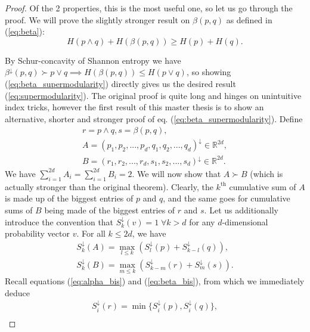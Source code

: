\begin{proof} \label{proof:alternative_supermodularity}
    Of the 2 properties, this is the most useful one, so let us go through the proof. We will prove the slightly stronger result on $\beta(p, q)$ as defined in (\ref{eq:beta}):
    \begin{equation} \label{eq:beta_supermodularity}
        H(p \wedge q) + H(\beta(p, q)) \geq H(p) + H(q).
    \end{equation}

    By Schur-concavity of Shannon entropy we have $\beta^\downarrow(p, q) \succ p \vee q \implies H(\beta(p, q)) \leq H(p \vee q)$, so showing (\ref{eq:beta_supermodularity}) directly gives us the desired result (\ref{eq:supermodularity}). The original proof is quite long and hinges on unintuitive index tricks, however the first result of this master thesis is to show an alternative, shorter and stronger proof of eq. (\ref{eq:beta_supermodularity}). Define
    \begin{gather}
        r = p \wedge q, s = \beta(p, q), \\
        A = (p_1, p_2, ..., p_d, q_1, q_2, ..., q_d)^\downarrow \in \mathbb{R}^{2d}, \\
        B = (r_1, r_2, ..., r_d, s_1, s_2, ..., s_d)^\downarrow \in \mathbb{R}^{2d}.
    \end{gather}
    We have $\sum_{i=1}^{2d} A_i = \sum_{i=1}^{2d} B_i = 2$. We will now show that $A \succ B$ (which is actually stronger than the original theorem). Clearly, the $k^{\text{th}}$ cumulative sum of $A$ is made up of the biggest entries of $p$ and $q$, and the same goes for cumulative sums of $B$ being made of the biggest entries of $r$ and $s$. Let us additionally introduce the convention that $S^\downarrow_k (v) = 1 \; \forall k > d$ for any $d$-dimensional probability vector $v$. For all $k \leq 2d$, we have 
    \begin{gather}
        S^\downarrow_k (A) = \max_{l\leq k} (S^\downarrow_l (p) + S^\downarrow_{k-l} (q)), \\
        S^\downarrow_k (B) = \max_{m\leq k} (S^\downarrow_{k-m} (r)+ S^\downarrow_m (s)).
    \end{gather} %
    Recall equations (\ref{eq:alpha_bis}) and (\ref{eq:beta_bis}), from which we immediately deduce
    \begin{gather}
        S^\downarrow_i (r) = \min \{S^\downarrow_i (p), S^\downarrow_i (q)\}, \\

\end{gather}
\end{proof}
